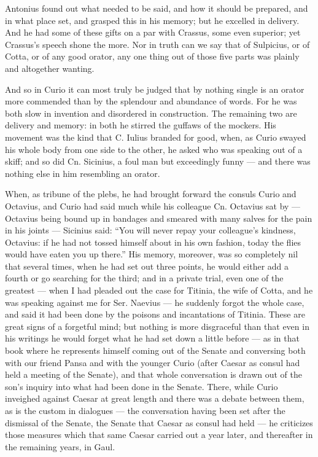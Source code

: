  Antonius found out what needed to be said, and how it should be prepared, and in what place set, and grasped this in his memory; but he excelled in delivery. And he had some of these gifts on a par with Crassus, some even superior; yet Crassus's speech shone the more. Nor in truth can we say that of Sulpicius, or of Cotta, or of any good orator, any one thing out of those five parts was plainly and altogether wanting.

 And so in Curio it can most truly be judged that by nothing single is an orator more commended than by the splendour and abundance of words. For he was both slow in invention and disordered in construction. The remaining two are delivery and memory: in both he stirred the guffaws of the mockers. His movement was the kind that C. Iulius branded for good, when, as Curio swayed his whole body from one side to the other, he asked who was speaking out of a skiff; and so did Cn. Sicinius, a foul man but exceedingly funny — and there was nothing else in him resembling an orator.

 When, as tribune of the plebs, he had brought forward the consuls Curio and Octavius, and Curio had said much while his colleague Cn. Octavius sat by — Octavius being bound up in bandages and smeared with many salves for the pain in his joints — Sicinius said: ``You will never repay your colleague's kindness, Octavius: if he had not tossed himself about in his own fashion, today the flies would have eaten you up there.'' His memory, moreover, was so completely nil that several times, when he had set out three points, he would either add a fourth or go searching for the third; and in a private trial, even one of the greatest — when I had pleaded out the case for Titinia, the wife of Cotta, and he was speaking against me for Ser. Naevius — he suddenly forgot the whole case, and said it had been done by the poisons and incantations of Titinia. These are great signs of a forgetful mind; but nothing is more disgraceful than that even in his writings he would forget what he had set down a little before — as in that book where he represents himself coming out of the Senate and conversing both with our friend Pansa and with the younger Curio (after Caesar as consul had held a meeting of the Senate), and that whole conversation is drawn out of the son's inquiry into what had been done in the Senate. There, while Curio inveighed against Caesar at great length and there was a debate between them, as is the custom in dialogues — the conversation having been set after the dismissal of the Senate, the Senate that Caesar as consul had held — he criticizes those measures which that same Caesar carried out a year later, and thereafter in the remaining years, in Gaul.

